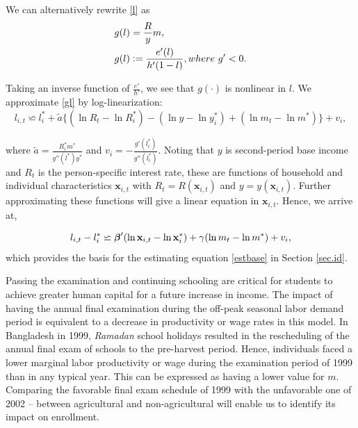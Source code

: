 \documentclass[12pt,letterpaper]{article}
\newcommand{\bfbeta}{\ensuremath{\mbox{\boldmath $\beta$}}}
\newcommand{\0}{\ensuremath{\mbox{\boldmath $0$}}}
\begin{document}
We can alternatively rewrite \eqref{l} as
\begin{equation}
\begin{aligned}
g(l)    &=\frac{R}{y}m, \\
g(l)    &\mathrel{\mathop:}= \frac{e'(l)}{h'(1-l)}, where \ g'<0.
\end{aligned}
\label{gl}
\end{equation}

Taking an inverse function of $\frac{e'}{h'}$, we see that $g(\cdot)$ is nonlinear in $l$. We approximate \eqref{gl} by log-linearization:
\[
 l_{i,t}\backsimeq  l^{*}_{i}+\tilde{a}\{(\ln R_{t}-\ln R^{*}_{i}) - (\ln y-\ln y^{*}_{i}) + (\ln m_{t}-\ln m^{*})\} + v_{i},
\]


where $\tilde{a}=\tfrac{R^{*}_{i}m^{*}}{g''(l^{*})y^{*}}$ and $v_{i}=-\tfrac{g'(l^{*}_{i})}{g''(l^{*}_{i})}$. Noting that $y$ is second-period base income and $R_{t}$ is the person-specific interest rate, these are functions of household and individual characteristics $\textbf{x}_{i,t}$ with $R_{t}=R(\textbf{x}_{i,t})$ and $y=y(\textbf{x}_{i,t})$. Further approximating these functions will give a linear equation in $\textbf{x}_{i,t}$. Hence, we arrive at,

\begin{equation}
 l_{i,t}- l^{*}_{i}\backsimeq \bfbeta'(\ln \textbf{x}_{i,t}-\ln \textbf{x}^{*}_{i}) + \gamma(\ln m_{t}-\ln m^{*}) + v_{i},
 \label{lsimeq}
\end{equation}
which provides the basis for the estimating equation \eqref{estbase} in Section \ref{sec.id}.

Passing the examination and continuing schooling are critical for students to achieve greater human capital for a future increase in income. The impact of having the annual final examination during the off-peak seasonal labor demand period is equivalent to a decrease in productivity or wage rates in this model. In Bangladesh in 1999, \textit{Ramadan} school holidays resulted in the rescheduling of the annual final exam of schools to the pre-harvest period. Hence, individuals faced a lower marginal labor productivity or wage during the examination period of 1999 than in any typical year. This can be expressed as having a lower value for $m$. Comparing the favorable final exam schedule of 1999 with the unfavorable one of 2002 -- between agricultural and non-agricultural will enable us to identify its impact on enrollment.

\end{document}
